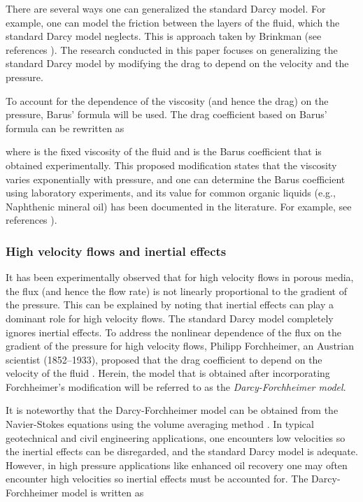 \documentclass[11pt,reqno]{amsart}
\begin{document}
There are several ways one can generalized the standard 
Darcy model. For example, one can model the friction 
between the layers of the fluid, which the standard 
Darcy model neglects. This is approach taken by 
Brinkman (see references \cite{Brinkman_ASR_1947_vA1_p27,
Shriram_Nakshatrala}). The research conducted in this paper 
focuses on generalizing the standard Darcy model by modifying 
the drag to depend on the velocity and the pressure.  

To account for the dependence of the viscosity 
(and hence the drag) on the pressure, Barus' 
formula \cite{Szeri}will be used. The drag 
coefficient based on Barus' formula can be 
rewritten as

where  is the fixed viscosity of the fluid and 
 is the Barus coefficient that is 
obtained experimentally. This proposed modification 
states that the viscosity varies exponentially with 
pressure, and one can determine the Barus coefficient 
 using laboratory experiments, and 
its value for common organic liquids (e.g., Naphthenic 
mineral oil) has been documented in the literature. 
For example, see references 
\cite{Bridgman,Abramson_PRE_2009_v80_021201,
Vesovic_Wakeham_Olchowy_Sengers_Watson_Millat_JPhysChem_1990_v19_p763,
Hoglund_Wear_1999_v232_p176}). 

\subsubsection{High velocity flows and inertial effects}
It has been experimentally observed that for high velocity 
flows in porous media, the flux (and hence the flow rate) 
is not linearly proportional to the gradient of the pressure. 
This can be explained by noting that inertial effects can 
play a dominant role for high velocity flows. The standard 
Darcy model completely ignores inertial effects. To address 
the nonlinear dependence of the flux on the gradient of the 
pressure for high velocity flows, Philipp Forchheimer, an 
Austrian scientist (1852--1933), proposed that the drag 
coefficient to depend on the velocity of the fluid 
\cite{Forchheimer_1901_v45_p1782}. Herein, the model 
that is obtained after incorporating Forchheimer's 
modification will be referred to as the 
\emph{Darcy-Forchheimer model}. 

It is noteworthy that the Darcy-Forchheimer model can 
be obtained from the Navier-Stokes equations using the 
volume averaging method \cite{ISI:A1996VK96700002}. In 
typical geotechnical and civil engineering applications, 
one encounters low velocities so the inertial effects 
can be disregarded, and the standard Darcy model is 
adequate. However, in high pressure applications like 
enhanced oil recovery one may often encounter high 
velocities so inertial effects must be accounted for. 
The Darcy-Forchheimer model is written as 
\end{document}
